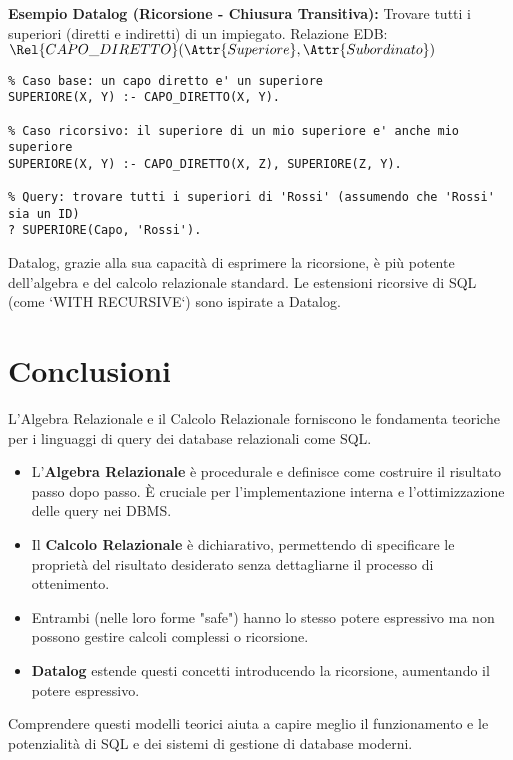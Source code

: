 \textbf{Esempio Datalog (Ricorsione - Chiusura Transitiva):} Trovare tutti i superiori (diretti e indiretti) di un impiegato.
Relazione EDB: $\Rel{CAPO\_DIRETTO}(\Attr{Superiore}, \Attr{Subordinato})$
\begin{verbatim}
% Caso base: un capo diretto e' un superiore
SUPERIORE(X, Y) :- CAPO_DIRETTO(X, Y).

% Caso ricorsivo: il superiore di un mio superiore e' anche mio superiore
SUPERIORE(X, Y) :- CAPO_DIRETTO(X, Z), SUPERIORE(Z, Y).

% Query: trovare tutti i superiori di 'Rossi' (assumendo che 'Rossi' sia un ID)
? SUPERIORE(Capo, 'Rossi').
\end{verbatim}
Datalog, grazie alla sua capacità di esprimere la ricorsione, è più potente dell'algebra e del calcolo relazionale standard. Le estensioni ricorsive di SQL (come `WITH RECURSIVE`) sono ispirate a Datalog.

\section{Conclusioni}
L'Algebra Relazionale e il Calcolo Relazionale forniscono le fondamenta teoriche per i linguaggi di query dei database relazionali come SQL.
\begin{itemize}
	\item L'\textbf{Algebra Relazionale} è procedurale e definisce come costruire il risultato passo dopo passo. È cruciale per l'implementazione interna e l'ottimizzazione delle query nei DBMS.
	\item Il \textbf{Calcolo Relazionale} è dichiarativo, permettendo di specificare le proprietà del risultato desiderato senza dettagliarne il processo di ottenimento.
	\item Entrambi (nelle loro forme "safe") hanno lo stesso potere espressivo ma non possono gestire calcoli complessi o ricorsione.
	\item \textbf{Datalog} estende questi concetti introducendo la ricorsione, aumentando il potere espressivo.
\end{itemize}
Comprendere questi modelli teorici aiuta a capire meglio il funzionamento e le potenzialità di SQL e dei sistemi di gestione di database moderni.

